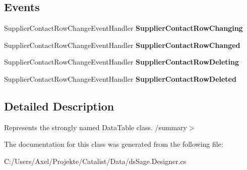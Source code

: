 \subsection*{Events}
\begin{DoxyCompactItemize}
\item 
Supplier\+Contact\+Row\+Change\+Event\+Handler {\bfseries Supplier\+Contact\+Row\+Changing}\hypertarget{class_products_1_1_data_1_1ds_sage_1_1_supplier_contact_data_table_a9fe0332459f79813411c12037e527206}{}\label{class_products_1_1_data_1_1ds_sage_1_1_supplier_contact_data_table_a9fe0332459f79813411c12037e527206}

\item 
Supplier\+Contact\+Row\+Change\+Event\+Handler {\bfseries Supplier\+Contact\+Row\+Changed}\hypertarget{class_products_1_1_data_1_1ds_sage_1_1_supplier_contact_data_table_a4dd0f1f41c4e2336992b13747987ab8c}{}\label{class_products_1_1_data_1_1ds_sage_1_1_supplier_contact_data_table_a4dd0f1f41c4e2336992b13747987ab8c}

\item 
Supplier\+Contact\+Row\+Change\+Event\+Handler {\bfseries Supplier\+Contact\+Row\+Deleting}\hypertarget{class_products_1_1_data_1_1ds_sage_1_1_supplier_contact_data_table_a03cf7ea85579f6ee9f080438e77fbd56}{}\label{class_products_1_1_data_1_1ds_sage_1_1_supplier_contact_data_table_a03cf7ea85579f6ee9f080438e77fbd56}

\item 
Supplier\+Contact\+Row\+Change\+Event\+Handler {\bfseries Supplier\+Contact\+Row\+Deleted}\hypertarget{class_products_1_1_data_1_1ds_sage_1_1_supplier_contact_data_table_a78e59925e28f897675cdb21353434b70}{}\label{class_products_1_1_data_1_1ds_sage_1_1_supplier_contact_data_table_a78e59925e28f897675cdb21353434b70}

\end{DoxyCompactItemize}


\subsection{Detailed Description}
Represents the strongly named Data\+Table class. /summary$>$ 

The documentation for this class was generated from the following file\+:\begin{DoxyCompactItemize}
\item 
C\+:/\+Users/\+Axel/\+Projekte/\+Catalist/\+Data/ds\+Sage.\+Designer.\+cs\end{DoxyCompactItemize}
